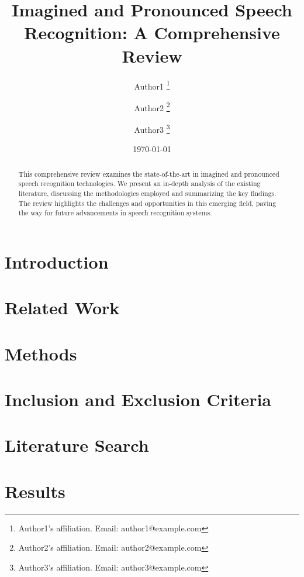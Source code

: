\documentclass[journal]{IEEEtran}
\title{Imagined and Pronounced Speech Recognition: A Comprehensive Review}
\author{Author1 \thanks{Author1's affiliation. Email: author1@example.com} \and
	Author2 \thanks{Author2's affiliation. Email: author2@example.com} \and
	Author3 \thanks{Author3's affiliation. Email: author3@example.com}}
\date{\today}
\begin{document}
	
	\maketitle
	
	\begin{abstract}
		This comprehensive review examines the state-of-the-art in imagined and pronounced speech recognition technologies. We present an in-depth analysis of the existing literature, discussing the methodologies employed and summarizing the key findings. The review highlights the challenges and opportunities in this emerging field, paving the way for future advancements in speech recognition systems.
	\end{abstract}
	
	\section{Introduction}
	\lipsum[1-2] %
	
	\section{Related Work}
	\lipsum[3-4] %
	
	\section{Methods}
	\lipsum[5] %
	
	\section{Inclusion and Exclusion Criteria}
	\lipsum[6] %
	
	\section{Literature Search}
	\lipsum[7] %
	
	\section{Results}
	\lipsum[8-10] %
\end{document}
